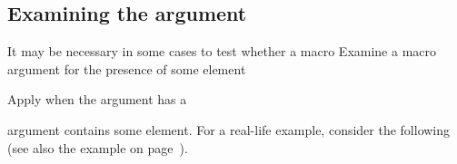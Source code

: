 \documentclass[letterpaper]{book}
\begin{document}
\subsection{Examining the argument}

It may be necessary in some cases to test whether a macro
\howto Examine a macro argument for the presence of some element\par
\howto Apply  when the argument has a \par
argument contains some element. For a real-life example,
consider the following (see also the 
\alt
example on page~\pageref{left:display}).
\end{document}
